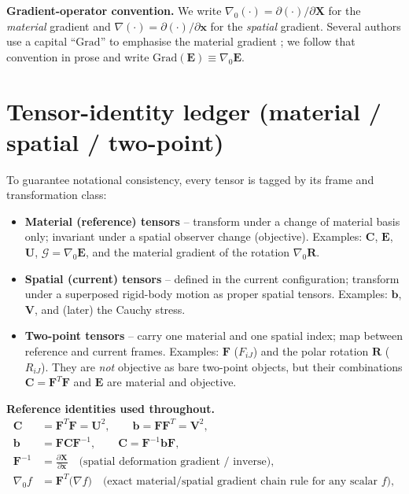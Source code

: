 \documentclass[11pt]{article}
\newcommand{\gradz}{\nabla_{0}}
\newcommand{\bX}{\mathbf{X}}
\newcommand{\bx}{\mathbf{x}}
\newcommand{\bF}{\mathbf{F}}
\newcommand{\bC}{\mathbf{C}}
\newcommand{\bb}{\mathbf{b}}
\newcommand{\bE}{\mathbf{E}}
\newcommand{\bR}{\mathbf{R}}
\newcommand{\gradz}{\nabla_{0}}
\newcommand{\bX}{\mathbf{X}}
\newcommand{\bx}{\mathbf{x}}
\newcommand{\bF}{\mathbf{F}}
\newcommand{\bC}{\mathbf{C}}
\newcommand{\bb}{\mathbf{b}}
\newcommand{\bE}{\mathbf{E}}
\newcommand{\bR}{\mathbf{R}}
\newcommand{\bU}{\mathbf{U}}
\newcommand{\bV}{\mathbf{V}}
\begin{document}
\textbf{Gradient-operator convention.} We write $\gradz(\cdot)=
\partial(\cdot)/\partial\bX$ for the \emph{material} gradient and
$\nabla(\cdot)=\partial(\cdot)/\partial\bx$ for the \emph{spatial}
gradient. Several authors use a capital ``$\mathrm{Grad}$'' to emphasise
the material gradient \cite{BonetWood2008}; we follow that convention
in prose and write $\mathrm{Grad}(\mathbf{E})\equiv\gradz\mathbf{E}$.

\section{Tensor-identity ledger (material / spatial / two-point)}
\label{sec:ledger}

To guarantee notational consistency, every tensor is tagged by its frame
and transformation class:

\begin{itemize}
\item \textbf{Material (reference) tensors} -- transform under a change of
material basis only; invariant under a spatial observer change
(objective). Examples: $\bC$, $\bE$, $\bU$,
$\bm{\mathcal{G}}=\gradz\bE$, and the material gradient of the rotation
$\gradz\bR$.

\item \textbf{Spatial (current) tensors} -- defined in the current
configuration; transform under a superposed rigid-body motion as proper
spatial tensors. Examples: $\bb$, $\bV$, and (later) the Cauchy stress.

\item \textbf{Two-point tensors} -- carry one material and one spatial
index; map between reference and current frames. Examples:
$\bF$ ($F_{iJ}$) and the polar rotation $\bR$ ($R_{iJ}$). They are
\emph{not} objective as bare two-point objects, but their combinations
$\bC=\bF^{T}\bF$ and $\bE$ are material and objective.
\end{itemize}

\noindent\textbf{Reference identities used throughout.}
\begin{align}
\bC &= \bF^{T}\bF = \bU^{2}, \qquad \bb = \bF\bF^{T} = \bV^{2},
\label{eq:id_Cb}\\
\bb &= \bF\bC\bF^{-1}, \qquad \bC = \bF^{-1}\bb\bF,
\label{eq:id_pushpull}\\
\bF^{-1} &= \frac{\partial\bX}{\partial\bx}
\quad\text{(spatial deformation gradient / inverse)},
\label{eq:id_invF}\\
\gradz f &= \bF^{T}\bigl(\nabla f\bigr)
\quad\text{(exact material/spatial gradient chain rule for any scalar $f$)},
\label{eq:id_gradpull}
\end{align}
\end{document}
